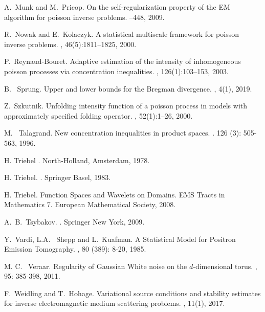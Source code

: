 \documentclass[10pt]{iopart}
\begin{document}
\begin{thebibliography}{10}
A.~Munk and M.~Pricop.
\newblock On the self-regularization property of the {EM} algorithm for poisson inverse problems.
--448, 2009.

R.~Nowak and E.~Kolaczyk.
\newblock A statistical multiscale framework for poisson inverse problems.
, 46(5):1811--1825, 2000.



P.~Reynaud-Bouret.
\newblock Adaptive estimation of the intensity of inhomogeneous poisson
  processes via concentration inequalities.
, 126(1):103--153, 2003.
 

B.~ Sprung.
\newblock Upper and lower bounds for the Bregman divergence.
, 4(1), 2019.  
  
  
Z.~Szkutnik.
\newblock Unfolding intensity function of a poisson process in models with
  approximately specified folding operator.
, 52(1):1--26, 2000.  
  

M. ~Talagrand.
New concentration inequalities in product spaces. 
. 126 (3): 505-563, 1996.

H. Triebel
. 
North-Holland, Amsterdam, 1978.


H. Triebel.
.
\newblock Springer Basel, 1983.

H. Triebel.
\newblock Function Spaces and Wavelets on Domains. EMS Tracts in Mathematics
7. European Mathematical Society, 2008.


A.~B.~Tsybakov.
.
\newblock Springer New York, 2009.


Y.~Vardi, L.A. ~Shepp and L.~Kuafman. 
\newblock A Statistical Model for Positron Emission Tomography. 
, 80 (389): 8-20, 1985.

M. C. ~Veraar.
\newblock Regularity of Gaussian White noise on the $d$-dimensional torus. 
, 95: 385-398, 2011.


F.~Weidling and T.~Hohage.
\newblock Variational source conditions and stability estimates for inverse electromagnetic medium scattering problems.
, 11(1), 2017.



\end{thebibliography}
\end{document}
